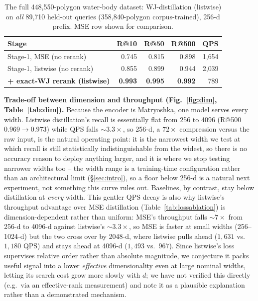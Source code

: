 \documentclass[sigconf]{acmart}
\begin{document}
\begin{table}[t]\centering
\caption{The full 448,550-polygon water-body dataset: WJ-distillation (listwise) on
\emph{all} 89,710 held-out queries (358,840-polygon corpus-trained), 256-d prefix.
MSE row shown for comparison.}
\label{tab:wbfull}\setlength{\tabcolsep}{4pt}\small
\begin{tabular}{@{}lrrrr@{}}
\toprule
Stage & R@10 & R@50 & R@500 & QPS \\
\midrule
Stage-1, MSE (no rerank)        & 0.745 & 0.815 & 0.898 & 1{,}654 \\
Stage-1, listwise (no rerank)   & 0.855 & 0.899 & 0.944 & 2{,}039 \\
\textbf{+ exact-WJ rerank (listwise)} & \textbf{0.993} & \textbf{0.995} & \textbf{0.992} & 789 \\
\bottomrule
\end{tabular}
\end{table}

\textbf{Trade-off between dimension and throughput (Fig.~\ref{fig:dim}, Table~\ref{tab:dim}).}
Because the encoder is Matryoshka, one model serves every width. Listwise
distillation's recall is essentially flat from 256 to 4096 (R@500
$0.969\!\to\!0.973$) while QPS falls ${\sim}3.3\times$, so 256-d, a $72\times$
compression versus the raw input, is the natural operating point: it is the narrowest
width we test at which recall is still statistically indistinguishable from the
widest, so there is no accuracy reason to deploy anything larger, and it is where we
stop testing narrower widths too -- the width range is a training-time configuration
rather than an architectural limit (\S\ref{sec:intro}), so a floor below 256-d is a
natural next experiment, not something this curve rules out. Baselines, by contrast, stay below
distillation at \emph{every} width. This gentler QPS decay is also why listwise's
throughput advantage over MSE distillation (Table~\ref{tab:lossablation}) is
dimension-dependent rather than uniform: MSE's throughput falls ${\sim}7\times$ from
256-d to 4096-d against listwise's ${\sim}3.3\times$, so MSE is faster at small widths
(256--1024-d) but the two cross over by 2048-d, where listwise pulls ahead
($1{,}631$ vs.\ $1{,}180$ QPS) and stays ahead at 4096-d ($1{,}493$ vs.\ $967$). Since
listwise's loss supervises relative order rather than absolute magnitude, we conjecture
it packs useful signal into a lower \emph{effective} dimensionality even at large
nominal widths, letting its search cost grow more slowly with $d$; we have not verified
this directly (e.g.\ via an effective-rank measurement) and note it as a plausible
explanation rather than a demonstrated mechanism.
\end{document}
